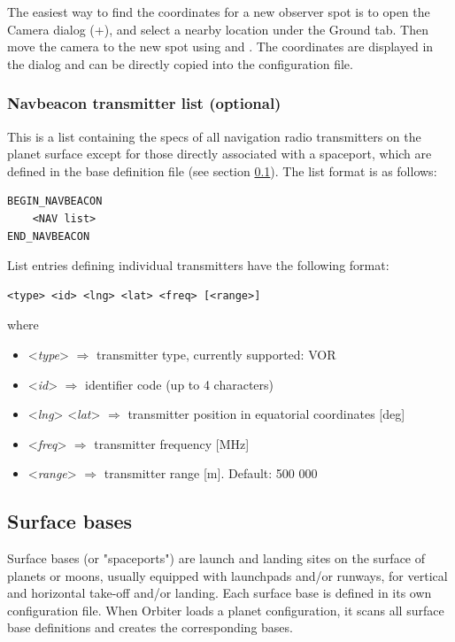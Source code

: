 \documentclass[Orbiter Developer Manual.tex]{subfiles}
\begin{document}
\noindent
The easiest way to find the coordinates for a new observer spot is to open the Camera dialog (\Ctrl+), and select a nearby location under the Ground tab. Then move the camera to the new spot using \Ctrl\DArrow\UArrow\RArrow\LArrow and . The coordinates are displayed in the dialog and can be directly copied into the configuration file.


\subsubsection*{Navbeacon transmitter list (optional)}
This is a list containing the specs of all navigation radio transmitters on the planet surface except for those directly associated with a spaceport, which are defined in the base definition file (see section \ref{ssec:surface_bases}). The list format is as follows:

\begin{lstlisting}[language=OSFS]
BEGIN_NAVBEACON
	<NAV list>
END_NAVBEACON
\end{lstlisting}

\noindent
List entries defining individual transmitters have the following format:

\begin{lstlisting}[language=OSFS]
<type> <id> <lng> <lat> <freq> [<range>]
\end{lstlisting}

\noindent
where

\begin{itemize}
\item <\textit{type}> $\Rightarrow$ transmitter type, currently supported: VOR
\item <\textit{id}> $\Rightarrow$ identifier code (up to 4 characters)
\item <\textit{lng}> <\textit{lat}> $\Rightarrow$ transmitter position in equatorial coordinates [deg]
\item <\textit{freq}> $\Rightarrow$ transmitter frequency [MHz]
\item <\textit{range}> $\Rightarrow$ transmitter range [m]. Default: 500 000
\end{itemize}


\subsection{Surface bases}
\label{ssec:surface_bases}
Surface bases (or "spaceports") are launch and landing sites on the surface of planets or moons, usually equipped with launchpads and/or runways, for vertical and horizontal take-off and/or landing. Each surface base is defined in its own configuration file. When Orbiter loads a planet configuration, it scans all surface base definitions and creates the corresponding bases.
\end{document}
